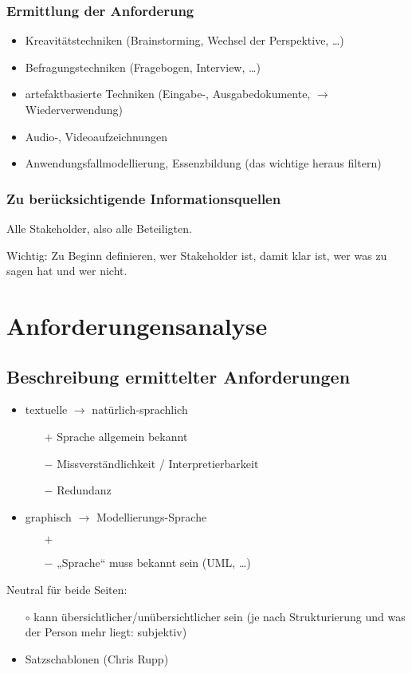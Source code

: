 \subsection{Ermittlung der Anforderung}

\begin{itemize}
\item Kreavitätstechniken (Brainstorming, Wechsel der Perspektive, …)
\item Befragungstechniken (Fragebogen, Interview, …)
\item artefaktbasierte Techniken (Eingabe-, Ausgabedokumente, $\to$ Wiederverwendung)
\item Audio‐, Videoaufzeichnungen
\item Anwendungsfallmodellierung, Essenzbildung (das wichtige heraus filtern)
\end{itemize}

\subsection{Zu berücksichtigende Informationsquellen}

Alle Stakeholder, also alle Beteiligten. 

Wichtig: Zu Beginn definieren, wer Stakeholder ist, damit klar ist, wer was zu sagen hat und wer nicht.

\chapter{Anforderungensanalyse}

\section*{Beschreibung ermittelter Anforderungen}
\begin{itemize}
\item textuelle $\to$ natürlich-sprachlich
\begin{itemize}
\item[$+$] Sprache allgemein bekannt
\item[$-$] Missverständlichkeit / Interpretierbarkeit
\item[$-$] Redundanz
\end{itemize}
\item graphisch $\to$ Modellierungs-Sprache
\begin{itemize}
\item[$+$] 
\item[$-$] „Sprache“ muss bekannt sein (UML, …)
\end{itemize}
\end{itemize}
Neutral für beide Seiten:
\begin{itemize}
\item[$\circ$] kann übersichtlicher/unübersichtlicher sein (je nach Strukturierung und was der Person mehr liegt: subjektiv)
\end{itemize}
\begin{itemize}
\item Satzschablonen (Chris Rupp)
\end{itemize}

